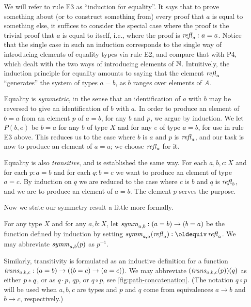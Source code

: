 We will refer to rule E3 as ``induction for equality''.  It says that to prove something about (or to construct something from) every proof that
$a$ is equal to something else, it suffices to consider the special case where the proof is the trivial proof that $a$ is equal to itself, i.e.,
where the proof is $\mathop{{\it refl}_{a}} : a=a$.  Notice that the single case in such an induction corresponds to the single way of introducing elements of
equality types via rule E2, and compare that with P4, which dealt with the two ways of introducing elements of $\mathbb{N}$.
Intuitively, the induction principle for equality amounts to saying that the element $\mathop{{\it refl}_{a}}$ ``generates'' the system of types $a=b$, as $b$
ranges over elements of $A$.

Equality is {\em symmetric}, in the sense that an identification of $a$ with $b$ may be reversed to give an identification of $b$ with $a$.  In
order to produce an element of $b=a$ from an element $p$ of $a=b$, for any $b$ and $p$, we argue by induction.  We let $P(b,e)$ be $b=a$ for any
$b$ of type $X$ and for any $e$ of type $a=b$, for use in rule E3 above. 
This reduces us to the case where $b$ is $a$ and $p$ is $\mathop{{\it refl}_{a}}$, and
our task is now to produce an element of $a=a$; we choose $\mathop{{\it refl}_{a}}$ for it.

Equality is also {\em transitive}, and is established the same way.  
For each $a,b,c:X$ and for each $p:a=b$ and for each $q:b=c$ we want to produce an
element of type $a=c$.  By induction on $q$ we are reduced to the case where $c$ is $b$ and $q$ is $\mathop{{\it refl}_{b}}$, and we are to produce an element
of $a=b$.  The element $p$ serves the purpose.  

Now we state our symmetry result a little more formally.

\begin{definition}\label{def:eq-symm}
For any type $X$ and for any $a,b:X$, let $\mathop{\mathit{symm}}_{a,b} : (a=b) \to (b=a)$ 
be the function defined by induction by setting
$\symm_{a,a}(\refl a) \defeq \refl a$.
We may abbreviate $\mathop{\mathit{symm}}_{a,b}(p)$ as $p^{-1}$.
\end{definition}

Similarly, transitivity is formulated as an inductive definition for 
a function $\mathop{\mathit{trans}}_{a,b,c} : (a=b) \to ((b=c) \to (a=c))$.  We may
abbreviate $(\mathop{\mathit{trans}}_{a,b,c}(p))(q)$ as either $p* q$, 
or as $q\cdot p$, $qp$, or $q\circ p$, see \cref{fig:path-concatenation}.
(The notation $q\circ p$ will be used when $a,b,c$ are types and
$p$ and $q$ come from equivalences $a\to b$ and $b\to c$, respectively.)


